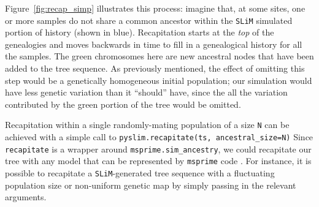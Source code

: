 \documentclass[12pt]{article}
\newcommand{\msprime}[0]{\texttt{msprime}\xspace}
\newcommand{\slim}[0]{\texttt{SLiM}\xspace}
\newcommand*{\ie}{i.e.\xcomma}
\begin{document}
Figure~\ref{fig:recap_simp} illustrates this process: imagine that, at some sites, one or more samples do not share
a common ancestor within the \slim simulated portion of history (shown in blue).
Recapitation starts at the \textit{top} of the genealogies and moves backwards in time
to fill in a genealogical history for all the samples.
The green chromosomes here are new ancestral nodes that have been added to the tree sequence.
As previously mentioned, the effect of omitting this step would be a genetically homogeneous initial population;
our simulation would have less genetic variation than it ``should'' have, since the all the variation
contributed by the green portion of the tree would be omitted.


Recapitation within a single randomly-mating population of a size \verb|N|
can be achieved with a simple call to \verb|pyslim.recapitate(ts, ancestral_size=N)|
Since \verb|recapitate| is a wrapper around
\verb|msprime.sim_ancestry|, we could recapitate our tree with any model that can be represented by \msprime code \citep{baumdicker_efficient_2022}.
For instance, it is possible to recapitate a \slim-generated tree sequence with a fluctuating population size
or non-uniform genetic map by simply passing in the relevant arguments.
\end{document}
